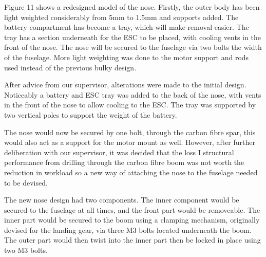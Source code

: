 \documentclass[../../main.tex]{subfiles}
\begin{document}

Figure 11 shows a redesigned model of the nose.
Firstly, the outer body has been light weighted considerably from 5mm to 1.5mm and supports added.
The battery compartment has become a tray, which will make removal easier.
The tray has a section underneath for the ESC to be placed, with cooling vents in the front of the nose.
The nose will be secured to the fuselage via two bolts the width of the fuselage.
More light weighting was done to the motor support and rods used instead of the previous bulky design. 


After advice from our supervisor, alterations were made to the initial design.
Noticeably a battery and ESC tray was added to the back of the nose, with vents in the front of the nose to allow cooling to the ESC.
The tray was supported by two vertical poles to support the weight of the battery. 


The nose would now be secured by one bolt, through the carbon fibre spar, this would also act as a support for the motor mount as well.
However, after further deliberation with our supervisor, it was decided that the loss I structural performance from drilling through the carbon fibre boom was not worth the reduction in workload so a new way of attaching the nose to the fuselage needed to be devised.  

The new nose design had two components.
The inner component would be secured to the fuselage at all times, and the front part would be removeable.
The inner part would be secured to the boom using a clamping mechanism, originally devised for the landing gear, via three M3 bolts located underneath the boom.
The outer part would then twist into the inner part then be locked in place using two M3 bolts. 
\end{document}
